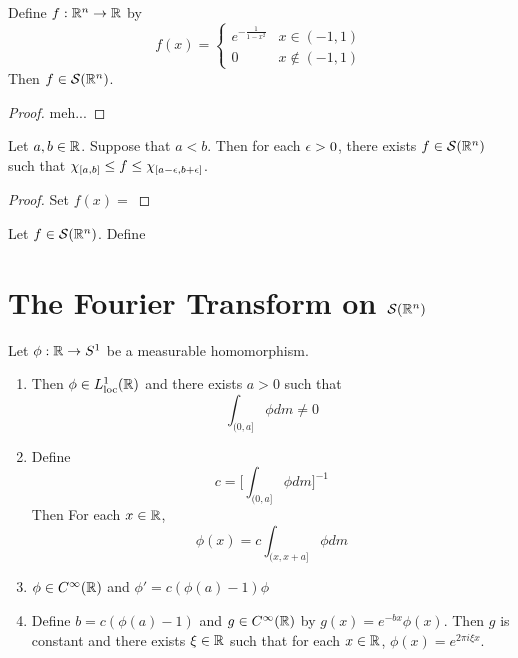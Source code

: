 \documentclass{book}
\begin{document}
	\begin{ex}
		Define $f:\mathbb{R}^n \rightarrow \mathbb{R}$ by 
		\[
		f(x) = 
		\begin{cases}
			e^{- \frac{1}{1-x^2}} & x \in (-1, 1) \\
			0 & x \not \in (-1, 1)
		\end{cases}
		\]
		Then $f \in \mathcal{S}(\mathbb{R}^n)$.
	\end{ex}
	
	\begin{proof}
		meh...
	\end{proof}

	\begin{ex}
		Let $a,b \in \mathbb{R}$. Suppose that $a < b$. Then for each $\epsilon >0$, there exists $f \in \mathcal{S}(\mathbb{R}^n)$ such that $\chi_{[a,b]} \leq f \leq \chi_{[a-\epsilon , b + \epsilon]}$.
	\end{ex}

	\begin{proof}
		Set $f(x) = $
	\end{proof}

	\begin{ex}
		Let $f \in \mathcal{S}(\mathbb{R}^n)$. Define
	\end{ex}
	
	
	
	
	
	
	
	
	
	
	
	
	
	
	
	
	
	
	
	
	
	
	
	
	
	
	
	
	
	
	
	
	
	
	\newpage
	\section{The Fourier Transform on $\mathcal{S}(\mathbb{R}^n)$}
	
	\begin{ex}
		 Let $\phi:\mathbb{R} \rightarrow S^1$ be a measurable homomorphism. 
		\begin{enumerate}
			\item Then $\phi \in L^1_{\text{loc}}(\mathbb{R})$ and there exists $a > 0$ such that $$\int_{(0,a]}\phi dm \neq 0$$
			\item Define $$c = \bigg[ \int_{(0,a]}\phi dm \bigg]^{-1}$$ 
			Then  For each $x \in \mathbb{R}$, $$\phi(x) = c\int_{(x, x+a]}\phi dm$$ 
			\item $\phi \in C^{\infty}(\mathbb{R})$ and $\phi' = c(\phi(a) - 1)\phi$
			\item Define $b = c(\phi(a) - 1)$ and $g \in C^{\infty}(\mathbb{R})$ by $g(x) = e^{-bx} \phi(x)$. Then $g$ is constant and there exists $\xi \in \mathbb{R}$ such that for each $x \in \mathbb{R}$, $\phi(x) = e^{2 \pi i \xi x}$.
		\end{enumerate}
	\end{ex}	
	
\end{document}
